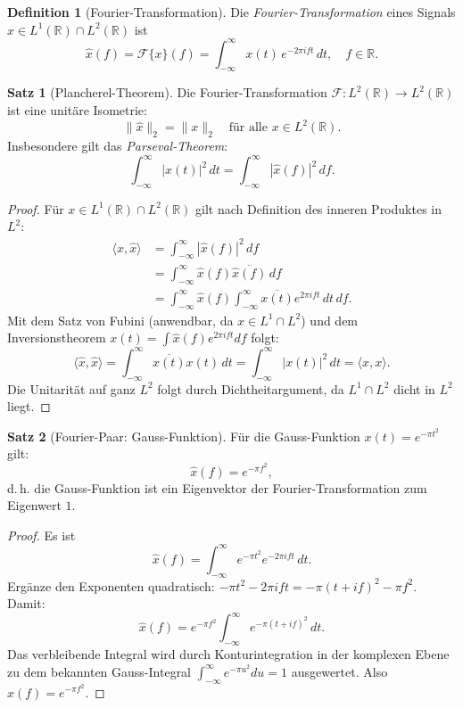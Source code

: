 ﻿\documentclass[a4paper,12pt]{article}
\theoremstyle{definition}
\newtheorem{definition}{Definition}
\newtheorem{satz}{Satz}
\begin{document}
\begin{definition}[Fourier-Transformation]
\label{def:fourier}
Die \emph{Fourier-Transformation} eines Signals $x \in L^1(\mathbb{R}) \cap L^2(\mathbb{R})$
ist
\[
\hat{x}(f) = \mathcal{F}\{x\}(f) = \int_{-\infty}^{\infty} x(t) \, e^{-2\pi i f t} \, dt, \quad f \in \mathbb{R}.
\]
\end{definition}

\begin{satz}[Plancherel-Theorem]
\label{satz:plancherel}
Die Fourier-Transformation $\mathcal{F}: L^2(\mathbb{R}) \to L^2(\mathbb{R})$
ist eine unitäre Isometrie:
\[
\|\hat{x}\|_2 = \|x\|_2 \quad \text{für alle } x \in L^2(\mathbb{R}).
\]
Insbesondere gilt das \emph{Parseval-Theorem}:
\[
\int_{-\infty}^{\infty} |x(t)|^2 \, dt = \int_{-\infty}^{\infty} |\hat{x}(f)|^2 \, df.
\]
\end{satz}

\begin{proof}
Für $x \in L^1(\mathbb{R}) \cap L^2(\mathbb{R})$ gilt nach Definition des inneren
Produktes in $L^2$:
\begin{align*}
\langle \hat{x}, \hat{x} \rangle
&= \int_{-\infty}^{\infty} |\hat{x}(f)|^2 \, df \\
&= \int_{-\infty}^{\infty} \hat{x}(f) \overline{\hat{x}(f)} \, df \\
&= \int_{-\infty}^{\infty} \hat{x}(f) \int_{-\infty}^{\infty} \overline{x(t)} e^{2\pi i f t} \, dt \, df.
\end{align*}
Mit dem Satz von Fubini (anwendbar, da $x \in L^1 \cap L^2$) und
dem Inversionstheorem $x(t) = \int \hat{x}(f) e^{2\pi i ft} df$ folgt:
\[
\langle \hat{x}, \hat{x} \rangle = \int_{-\infty}^{\infty} \overline{x(t)} x(t) \, dt
= \int_{-\infty}^{\infty} |x(t)|^2 \, dt = \langle x, x \rangle.
\]
Die Unitarität auf ganz $L^2$ folgt durch Dichtheitargument, da
$L^1 \cap L^2$ dicht in $L^2$ liegt.
\end{proof}

\begin{satz}[Fourier-Paar: Gauss-Funktion]
\label{satz:gauss}
Für die Gauss-Funktion $x(t) = e^{-\pi t^2}$ gilt:
\[
\hat{x}(f) = e^{-\pi f^2},
\]
d.\,h. die Gauss-Funktion ist ein Eigenvektor der Fourier-Transformation zum
Eigenwert $1$.
\end{satz}

\begin{proof}
Es ist
\[
\hat{x}(f) = \int_{-\infty}^{\infty} e^{-\pi t^2} e^{-2\pi i ft} \, dt.
\]
Ergänze den Exponenten quadratisch:
$-\pi t^2 - 2\pi i ft = -\pi(t + if)^2 - \pi f^2$.
Damit:
\[
\hat{x}(f) = e^{-\pi f^2} \int_{-\infty}^{\infty} e^{-\pi(t+if)^2} \, dt.
\]
Das verbleibende Integral wird durch Konturintegration in der komplexen Ebene zu
dem bekannten Gauss-Integral $\int_{-\infty}^{\infty} e^{-\pi u^2} du = 1$ ausgewertet.
Also $\hat{x}(f) = e^{-\pi f^2}$.
\end{proof}
\end{document}
